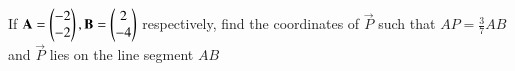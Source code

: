 If $\mathbf{A} = \begin{pmatrix}-2\\-2\end{pmatrix}, \mathbf{B} = \begin{pmatrix}2\\-4\end{pmatrix}$ respectively, find the coordinates of $\vec{P}$ such that $AP = \frac{3}{7}AB$ and $\vec{P}$ lies on the line segment $AB$
